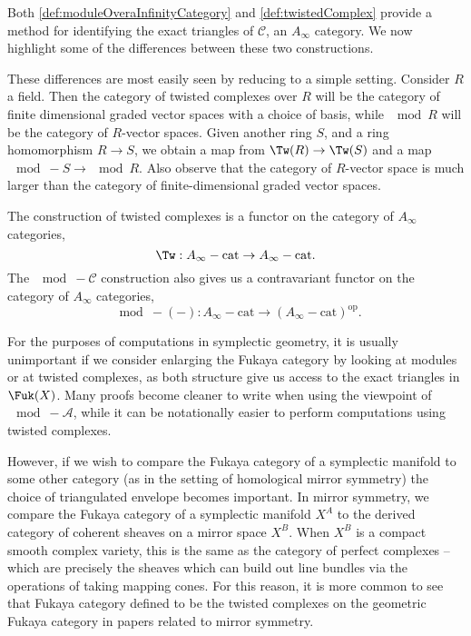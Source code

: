 
Both \cref{def:moduleOveraInfinityCategory} and \cref{def:twistedComplex} provide a method for identifying the exact triangles of $\mathcal C$, an $A_\infty$ category. We now highlight some of the differences between these two constructions.

These differences are most easily seen by reducing to a simple setting. Consider $R$ a field. Then the category of twisted complexes over $R$ will be the category of finite dimensional graded vector spaces with a choice of basis, while $\mod R$ will be the category of $R$-vector spaces. Given another ring $S$, and a ring homomorphism $R\to S$, we obtain a map from $\Tw(R)\to \Tw(S)$ and a map $\mod-S\to \mod R$. Also observe that the category of $R$-vector space is much larger than the category of finite-dimensional graded vector spaces.

The construction of twisted complexes is a functor on the category of $A_\infty$ categories,
\[\Tw:A_\infty-\text{cat}\to A_\infty-\text{cat}.\]
The $\mod-\mathcal C$ construction also gives us a contravariant functor on the category of $A_\infty$ categories,
\[\mod-(-):A_\infty-\text{cat}\to (A_\infty-\text{cat})^{\text{op}}.\]

For the purposes of computations in symplectic geometry, it is usually unimportant if we consider enlarging the Fukaya category by looking at modules or at twisted complexes, as both structure give us access to the exact triangles in $\Fuk(X)$. Many proofs become cleaner to write when using the viewpoint of $\mod-\mathcal A$, while it can be notationally easier to perform computations using twisted complexes. 

However, if we wish to compare the Fukaya category of a symplectic manifold to some other category (as in the setting of homological mirror symmetry) the choice of triangulated envelope becomes important. In mirror symmetry, we compare the Fukaya category of a symplectic manifold $X^A$ to the derived category of coherent sheaves on a mirror space $X^B$. When $X^B$ is a compact smooth complex variety, this is the same as the category of perfect complexes -- which are precisely the sheaves which can build out line bundles via the operations of taking mapping cones. For this reason, it is more common to see that Fukaya category defined to be the twisted complexes on the geometric Fukaya category in papers related to mirror symmetry.
